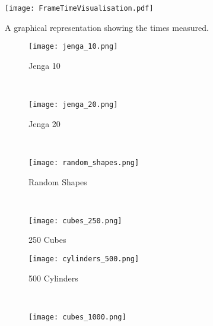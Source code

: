 \begin{figure}
    \centering
    \texttt{[image: FrameTimeVisualisation.pdf]} 
    \caption{A graphical representation showing the times measured.}
    \label{fig:frame-time-vis}
\end{figure}

\begin{figure}
        \centering
        \begin{subfigure}[b]{0.45\textwidth}
                \texttt{[image: jenga\_10.png]}
                \caption{Jenga 10}
                \label{fig:screenshot_jenga_10}
        \end{subfigure}%
        ~ %
        \begin{subfigure}[b]{0.45\textwidth}
                \texttt{[image: jenga\_20.png]}
                \caption{Jenga 20}
                \label{fig:screenshot_jenga_20}
        \end{subfigure}
        ~ %
        \begin{subfigure}[b]{0.45\textwidth}
                \texttt{[image: random\_shapes.png]}
                \caption{Random Shapes}
                \label{fig:random_shapes}
        \end{subfigure}
        ~ %
        \begin{subfigure}[b]{0.45\textwidth}
                \texttt{[image: cubes\_250.png]}
                \caption{250 Cubes}
                \label{fig:cubes_250}
        \end{subfigure}
        \begin{subfigure}[b]{0.45\textwidth}
                \texttt{[image: cylinders\_500.png]}
                \caption{500 Cylinders}
                \label{fig:cylinders_500}
        \end{subfigure}%
        ~ %
        \begin{subfigure}[b]{0.45\textwidth}
                \texttt{[image: cubes\_1000.png]}

\end{subfigure}
\end{figure}
